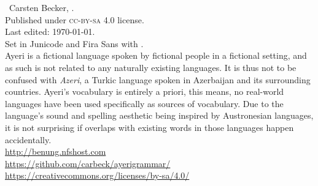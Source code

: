 
\begin{minipage}[b][\textheight][b]{0.67\textwidth}\small
\ccbysa~Carsten Becker, \the\year.\\
Published under \textsc{cc-by-sa} 4.0 license.\\
Last edited: \today{}.\\[.5\baselineskip]

Set in Junicode and {\sffamily Fira Sans} with \XeTeX{}.\\[.5\baselineskip]

Ayeri is a fictional language spoken by fictional people in a fictional setting, and as such is not related to any naturally existing languages. It is thus not to be confused with \emph{Azeri}, a Turkic language spoken in Azerbaijan and its surrounding countries. Ayeri’s vocabulary is entirely a priori, this means, no real-world languages have been used specifically as sources of vocabulary. Due to the language’s sound and spelling aesthetic being inspired by Austronesian languages, it is not surprising if overlaps with existing words in those languages happen accidentally.\\[.5\baselineskip]

\href{http://benung.nfshost.com}{http://benung.nfshost.com}\\
\href{https://github.com/carbeck/ayerigrammar}{https://github.com/carbeck/ayerigrammar/}\\
\href{https://creativecommons.org/licenses/by-sa/4.0/}{https://creativecommons.org/licenses/by-sa/4.0/}%

\end{minipage}
